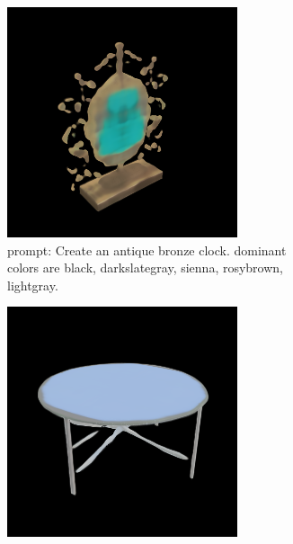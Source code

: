 \documentclass[11pt]{article}
\begin{document}
\begin{figure}[htbp]
    \centering
    \begin{subfigure}[t]{0.3\textwidth}
        \centering
        \includegraphics[width=\textwidth]{figures/antique_furniture.png}
        \caption{prompt: Create an antique bronze clock. dominant colors are black, darkslategray, sienna, rosybrown, lightgray.}
        \label{fig:antique_furniture}
    \end{subfigure}
    \hfill
    \begin{subfigure}[t]{0.3\textwidth}
        \centering
        \includegraphics[width=\textwidth]{figures/modern_furniture.png}

\end{subfigure}
\end{figure}
\end{document}
